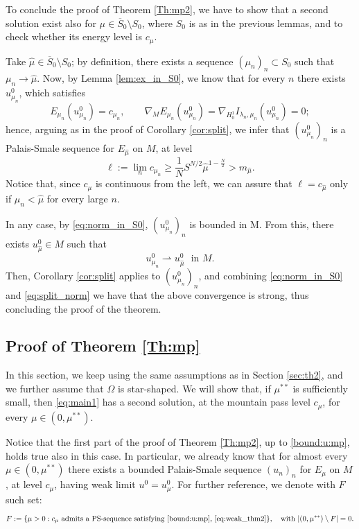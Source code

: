 \documentclass[10pt]{article}
\theoremstyle{definition}
\numberwithin{equation}{section}
\begin{document}
To conclude the proof of Theorem \ref{Th:mp2}, we have to show that a second solution exist
also for $\mu \in \overline{S}_0 \setminus S_0$, where $S_0$ is as in the previous
lemmas, and to check whether its energy level is
$c_{\mu}$.

Take $\hat{\mu}\in \overline{S}_0\setminus S_0$; by definition, there exists a sequence $(\mu_{n})_{n}\subset S_0$ such that $\mu_{n}\rightarrow\hat{\mu}$.
Now, by Lemma \ref{lem:ex_in_S0}, we know that for every $n$ there exists $u_{\mu_{n}}^{0}$, which satisfies
\[
E_{\mu_{n}}(u^{0}_{\mu_{n}}) = c_{\mu_{n}}, \qquad \nabla_M E_{\mu_{n}}(u^{0}_{\mu_{n}}) =
\nabla_{H^1_0} I_{\lambda_n,\mu_n}(u^{0}_{\mu_{n}})=0;
\]
hence, arguing as in the proof of Corollary \ref{cor:split}, we infer that $(u_{\mu_{n}}^{0})_{n}$ is a Palais-Smale sequence for $E_{\hat\mu}$ on $M$, at level
\[
\ell:=\lim_{n} c_{\mu_n}\ge
\frac{1}{N}S^{N/2}\hat\mu^{1-\frac{N}{2}}> m_{\hat\mu}.
\]
Notice that, since $c_\mu$ is continuous from the left,
we can assure that $\ell = c_{\hat\mu}$ only if $\mu_n < \hat \mu$ for every large $n$.

In any case, by \eqref{eq:norm_in_S0}, $(u_{\mu_{n}}^{0})_{n}$ is bounded in M. From this, there exists $u_{\hat{\mu}}^{0} \in M$ such that
\[
u_{\mu_{n}}^{0} \rightharpoonup u_{\hat{\mu}}^{0} \ \ \ \text{in } M.
\]
Then, Corollary \ref{cor:split} applies to $(u_{\mu_{n}}^{0})_{n}$, and
combining \eqref{eq:norm_in_S0} and \eqref{eq:split_norm} we have that the above convergence
is strong, thus concluding the proof of the theorem.








\subsection{Proof of Theorem \ref{Th:mp}}

In this section, we keep using the same assumptions as in Section \ref{sec:th2}, and we further
assume that $\Omega$ is star-shaped. We will show that, if $\mu^{**}$ is sufficiently small, then \eqref{eq:main1} has a second solution, at the mountain pass level $c_\mu$, for every
$\mu \in (0,\mu^{**})$.

Notice that the first part of the proof of Theorem \ref{Th:mp2}, up to \eqref{bound:u:mp}, holds true
also in this case. In particular, we already know that for almost every $\mu\in (0,\mu^{**})$ there
exists a bounded Palais-Smale sequence $(u_n)_n$ for $E_\mu$ on $M$, at level $c_\mu$, having weak
limit $u^0=u^0_\mu$. For further reference, we denote with $F$ such set:
\begin{equation}\label{eq:def_set_F}
F:=\{\mu>0:c_\mu\text{ admits a PS-sequence satisfying \eqref{bound:u:mp}, \eqref{eq:weak_thm2}}\},
\quad \text{with } |(0,\mu^{**})\setminus F|=0.
\end{equation}
\end{document}
